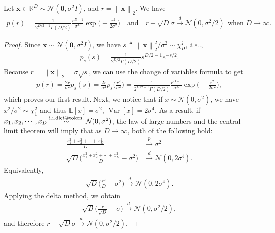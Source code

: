 \documentclass{article}
\makeatletter
\newcommand{\mbb}[1]{\mathbb{#1}}
\newcommand{\mcal}{\mathcal}
\newcommand{\norm}[1]{\left\lVert#1\right\rVert}
\newenvironment{customprop}[1]
{\renewcommand\theinnercustomprop{#1}\innercustomprop}
{\endinnercustomprop}
\def\@onedot{\ifx\@let@token.\else.\null\fi\xspace}
\DeclareRobustCommand\onedot{\futurelet\@let@token\@onedot}
\newcommand{\bfx}{\mathbf{x}}
\newcommand{\bfzero}{\mathbf{0}}
\def\ie{\emph{i.e}\onedot}
\def\iid{i.i.d\onedot}
\makeatother
\begin{document}
\begin{customprop}{\ref{prop:noise_levels}}
Let $\bfx \in \mbb{R}^D \sim \mcal{N}(\bfzero, \sigma^2 I)$, and $r = \norm{\bfx}_2$. We have
\begin{align*}
    p(r) = \frac{1}{2^{D/2 - 1}\Gamma(D/2)} \frac{r^{D-1}}{\sigma^{D}} \exp \bigg(-\frac{r^2}{2\sigma^2} \bigg)\quad \text{and} \quad
    r - \sqrt{D}\sigma \stackrel{d}{\to} \mcal{N}(0, \sigma^2 / 2) ~~\text{when $D \to \infty$}.
\end{align*}
\end{customprop}
\begin{proof}
Since $\bfx \sim \mcal{N}(\bfzero, \sigma^2 I)$, we have $s \triangleq \norm{\bfx}_2^2 / \sigma^2 \sim \chi^2_D$, \ie,
\begin{align*}
    p_s(s) = \frac{1}{2^{D/2} \Gamma(D / 2)} s^{D/2 - 1} e^{-s / 2}.
\end{align*}
Because $r = \norm{\bfx}_2 = \sigma \sqrt{s}$, we can use the change of variables formula to get
\begin{align*}
    p(r) = \frac{2r}{\sigma^2} p_s(s) = \frac{2r}{\sigma^2} p_s\bigg(\frac{r^2}{\sigma^2}\bigg) = \frac{1}{2^{D/2 - 1}\Gamma(D/2)} \frac{r^{D-1}}{\sigma^{D}} \exp \bigg(-\frac{r^2}{2\sigma^2} \bigg),
\end{align*}
which proves our first result. Next, we notice that if $x \sim \mcal{N}(0, \sigma^2)$, we have $x^2/\sigma^2 \sim \chi^2_1$ and thus $\mbb{E}[x] = \sigma^2$, $\operatorname{Var}[x] = 2\sigma^4$.
As a result, if ${x_1, x_2, \cdots, x_D} \stackrel{\text{\iid}}{\sim} \mcal{N}(0, \sigma^2)$, the law of large numbers and the central limit theorem will imply that as $D \to \infty$, both of the following hold:
\begin{align*}
    \frac{x_1^2 + x_2^2 + \cdots + x_D^2}{D} &\stackrel{p}{\to} \sigma^2\\
    \sqrt{D}\bigg( \frac{x_1^2 + x_2^2 + \cdots + x_D^2}{D} - \sigma^2 \bigg) &\stackrel{d}{\to} \mcal{N}(0, 2\sigma^4).
\end{align*}
Equivalently,
\begin{align*}
    \sqrt{D}\bigg( \frac{r^2}{D} - \sigma^2 \bigg) \stackrel{d}{\to} \mcal{N}(0, 2\sigma^4).
\end{align*}
Applying the delta method, we obtain
\begin{align*}
    \sqrt{D} \bigg ( \frac{r}{\sqrt{D}} - \sigma \bigg) \stackrel{d}{\to} \mcal{N}(0, \sigma^2 / 2),
\end{align*}
and therefore $r - \sqrt{D}\sigma \stackrel{d}{\to} \mcal{N}(0, \sigma^2 / 2)$.
\end{proof}
\end{document}
